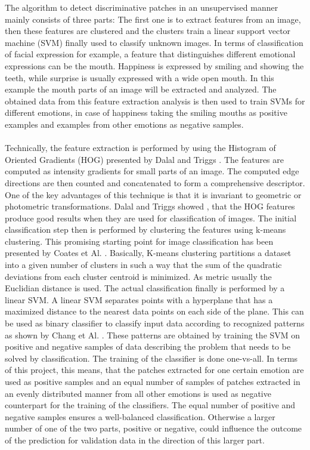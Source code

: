 The algorithm to detect discriminative patches in an unsupervised manner mainly consists of three parts: The first one is to extract features from an image, then these features are clustered and the clusters train a linear support vector machine (SVM) finally used to classify unknown images. In terms of classification of facial expression for example, a feature that distinguishes different emotional expressions can be the mouth. Happiness is expressed by smiling and showing the teeth, while surprise is usually expressed with a wide open mouth. In this example the mouth parts of an image will be extracted and analyzed. The obtained data from this feature extraction analysis is then used to train SVMs for different emotions, in case of happiness taking the smiling mouths as positive examples and examples from other emotions as negative samples.
\\
\\
Technically, the feature extraction is performed by using the Histogram of Oriented Gradients (HOG) presented by Dalal and Triggs \cite{Dalal:2005:HOG:1068507.1069007}. The features are computed as intensity gradients for small parts of an image. The computed edge directions are then counted and concatenated to form a comprehensive descriptor. One of the key advantages of this technique is that it is invariant to geometric or photometric transformations. Dalal and Triggs showed \cite{Dalal:2005:HOG:1068507.1069007}, that the HOG features produce good results when they are used for classification of images. The initial classification step then is performed by clustering the features using k-means clustering. This promising starting point for image classification has been presented by Coates et Al. \cite{DBLP:series/lncs/CoatesN12}. Basically, K-means clustering partitions a dataset into a given number of clusters in such a way that the sum of the quadratic deviations from each cluster centroid is minimized. As metric usually the Euclidian distance is used. The actual classification finally is performed by a linear SVM. A linear SVM separates points with a hyperplane that has a maximized distance to the nearest data points on each side of the plane. This can be used as binary classifier to classify input data according to recognized patterns as shown by Chang et Al. \cite{Chang:2011:LLS:1961189.1961199}. These patterns are obtained by training the SVM on positive and negative samples of data describing the problem that needs to be solved by classification. The training of the classifier is done one-vs-all. In terms of this project, this means, that the patches extracted for one certain emotion are used as positive samples and an equal number of samples of patches extracted in an evenly distributed manner from all other emotions is used as negative counterpart for the training of the classifiers. The equal number of positive and negative samples ensures a well-balanced classification. Otherwise a larger number of one of the two parts, positive or negative, could influence the outcome of the prediction for validation data in the direction of this larger part.

